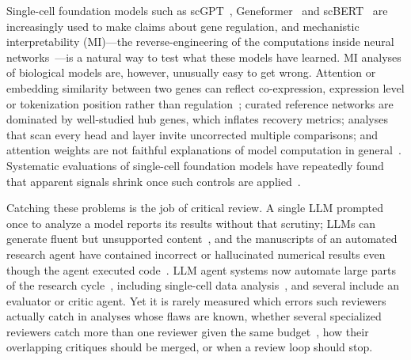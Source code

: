 \documentclass[10pt,letterpaper]{article}
\begin{document}
Single-cell foundation models such as scGPT~\cite{cui2024scgpt}, Geneformer~\cite{theodoris2023transfer} and scBERT~\cite{yang2022scbert} are increasingly used to make claims about gene regulation, and mechanistic interpretability (MI)---the reverse-engineering of the computations inside neural networks~\cite{olah2020zoom,elhage2022toy,conmy2023towards}---is a natural way to test what these models have learned. MI analyses of biological models are, however, unusually easy to get wrong. Attention or embedding similarity between two genes can reflect co-expression, expression level or tokenization position rather than regulation~\cite{pratapa2020benchmarking}; curated reference networks are dominated by well-studied hub genes, which inflates recovery metrics; analyses that scan every head and layer invite uncorrected multiple comparisons; and attention weights are not faithful explanations of model computation in general~\cite{jain2019attention,wiegreffe2019attention,serrano2019attention}. Systematic evaluations of single-cell foundation models have repeatedly found that apparent signals shrink once such controls are applied~\cite{kedzierska2025zeroshot,boiarsky2023deepdive,kendiukhov2026attention}.

Catching these problems is the job of critical review. A single LLM prompted once to analyze a model reports its results without that scrutiny; LLMs can generate fluent but unsupported content~\cite{farquhar2024semantic}, and the manuscripts of an automated research agent have contained incorrect or hallucinated numerical results even though the agent executed code~\cite{beel2025evaluating}. LLM agent systems now automate large parts of the research cycle~\cite{lu2026aiscientist,schmidgall2025agentlab,gottweis2026coscientist,swanson2025virtuallab}, including single-cell data analysis~\cite{xiao2026cellagent,alber2026cellvoyager}, and several include an evaluator or critic agent. Yet it is rarely measured which errors such reviewers actually catch in analyses whose flaws are known, whether several specialized reviewers catch more than one reviewer given the same budget~\cite{wang2024rethinking,smit2024mad}, how their overlapping critiques should be merged, or when a review loop should stop.
\end{document}
